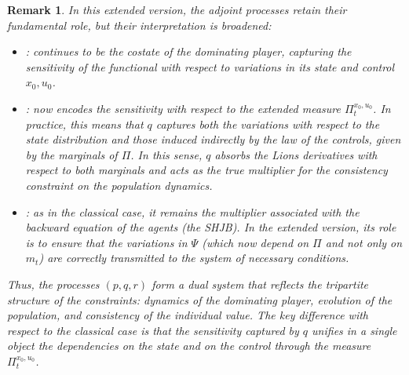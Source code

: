 \documentclass[12pt]{article}
\newtheorem*{obs*}{Remark}
\theoremstyle{definition}
\begin{document}
\begin{obs*}
In this extended version, the adjoint processes retain their fundamental role, but their interpretation is broadened:

\begin{itemize}
    \item {}: continues to be the costate of the dominating player, capturing the sensitivity of the functional with respect to variations in its state and control $x_0, u_0$.

    \item {}: now encodes the sensitivity with respect to the extended measure $\Pi^{x_0,u_0}_t$. In practice, this means that $q$ captures both the variations with respect to the state distribution and those induced indirectly by the law of the controls, given by the marginals of $\Pi$. In this sense, $q$ absorbs the Lions derivatives with respect to both marginals and acts as the true multiplier for the consistency constraint on the population dynamics.

    \item {}: as in the classical case, it remains the multiplier associated with the backward equation of the agents (the SHJB). In the extended version, its role is to ensure that the variations in $\Psi$ (which now depend on $\Pi$ and not only on $m_t$) are correctly transmitted to the system of necessary conditions.
\end{itemize}

Thus, the processes $(p,q,r)$ form a dual system that reflects the tripartite structure of the constraints: dynamics of the dominating player, evolution of the population, and consistency of the individual value. The key difference with respect to the classical case is that the sensitivity captured by $q$ unifies in a single object the dependencies on the state and on the control through the measure $\Pi^{x_0,u_0}_t$.
\end{obs*}
\end{document}
